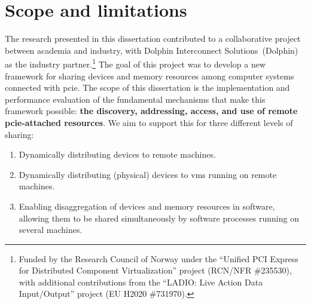 \section{Scope and limitations}\label{sec:scope}
The research presented in this dissertation contributed to a collaborative project between academia and industry, with Dolphin Interconnect Solutions~(Dolphin) as the industry partner.\footnote{Funded by the Research Council of Norway under the ``Unified PCI Express for Distributed Component Virtualization'' project (RCN/NFR \#235530), with additional contributions from the ``LADIO: Live Action Data Input/Output'' project (EU H2020 \#731970).}
%
The goal of this project was to develop a new framework for sharing devices and memory resources among computer systems connected with \gls{pcie}.
%
The scope of this dissertation is the implementation and performance evaluation of the fundamental mechanisms that make this framework possible: \textbf{the discovery, addressing, access, and use of remote \gls{pcie}-attached resources}.
%
We aim to support this for three different levels of sharing:
\begin{enumerate}
    \item Dynamically distributing devices to remote machines.
    \item Dynamically distributing (physical) devices to \glspl{vm} running on remote machines.
    \item Enabling \gls{disaggregation} of devices and memory resources in software, allowing them to be shared simultaneously by software processes running on several machines.
\end{enumerate}



